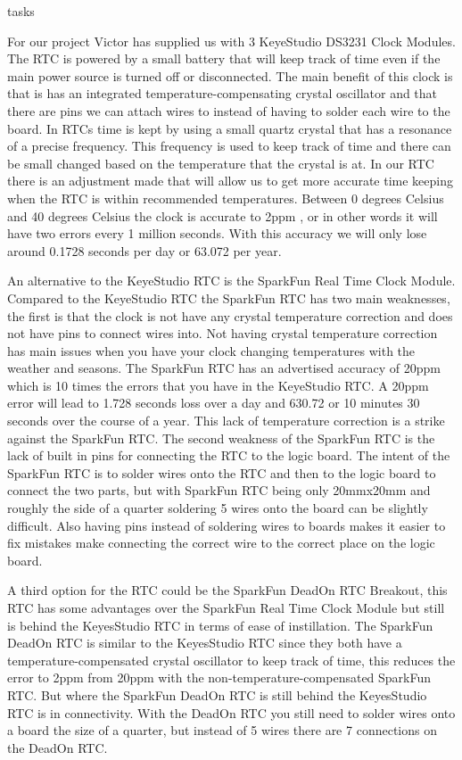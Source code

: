 tasks\documentclass[onecolumn, draftclsnofoot,10pt, compsoc]{IEEEtran}
\begin{document}
For our project Victor has supplied us with 3 KeyeStudio DS3231 Clock Modules.
The RTC is powered by a small battery that will keep track of time even if the main power source is turned off or disconnected.
The main benefit of this clock is that is has an integrated temperature-compensating crystal oscillator and that there are pins we can attach wires to instead of having to solder each wire to the board.
In RTCs time is kept by using a small quartz crystal that has a resonance of a precise frequency.
This frequency is used to keep track of time and there can be small changed based on the temperature that the crystal is at.
In our RTC there is an adjustment made that will allow us to get more accurate time keeping when the RTC is within recommended temperatures.
Between 0 degrees Celsius and 40 degrees Celsius the clock is accurate to 2ppm \cite{ksRTC}, or in other words it will have two errors every 1 million seconds.
With this accuracy we will only lose around 0.1728 seconds per day or 63.072 per year.

An alternative to the KeyeStudio RTC is the SparkFun Real Time Clock Module.
Compared to the KeyeStudio RTC the SparkFun RTC has two main weaknesses, the first is that the clock is not have any crystal temperature correction and does not have pins to connect wires into.
Not having crystal temperature correction has main issues when you have your clock changing temperatures with the weather and seasons.
The SparkFun RTC has an advertised accuracy of 20ppm which is 10 times the errors that you have in the KeyeStudio RTC.
A 20ppm error will lead to 1.728 seconds loss over a day and 630.72 or 10 minutes 30 seconds over the course of a year.
This lack of temperature correction is a strike against the SparkFun RTC.
The second weakness of the SparkFun RTC is the lack of built in pins for connecting the RTC to the logic board.
The intent of the SparkFun RTC is to solder wires onto the RTC and then to the logic board to connect the two parts, but with SparkFun RTC being only 20mmx20mm and roughly the side of a quarter \cite{sfRTC} soldering 5 wires onto the board can be slightly difficult.
Also having pins instead of soldering wires to boards makes it easier to fix mistakes make connecting the correct wire to the correct place on the logic board.

A third option for the RTC could be the SparkFun DeadOn RTC Breakout, this RTC has some advantages over the SparkFun Real Time Clock Module but still is behind the KeyesStudio RTC in terms of ease of instillation.
The SparkFun DeadOn RTC is similar to the KeyesStudio RTC since they both have a temperature-compensated crystal oscillator to keep track of time, this reduces the error to 2ppm \cite{sfDeadOn} from 20ppm with the non-temperature-compensated SparkFun RTC.
But where the SparkFun DeadOn RTC is still behind the KeyesStudio RTC is in connectivity.
With the DeadOn RTC you still need to solder wires onto a board the size of a quarter, but instead of 5 wires there are 7 connections on the DeadOn RTC.
\end{document}

